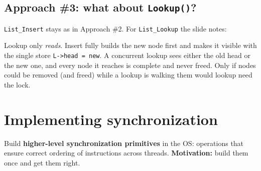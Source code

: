 \documentclass[11pt,a4paper]{article}
\begin{document}
\subsection{Approach \#3: what about \texttt{Lookup()}?}

\texttt{List\_Insert} stays as in Approach \#2. For \texttt{List\_Lookup}
the slide notes:

\begin{keybox}
Lookup only \emph{reads}. Insert fully builds the new node first and makes
it visible with the single store \texttt{L->head = new}. A concurrent lookup
sees either the old head or the new one, and every node it reaches is
complete and never freed. Only if nodes could be removed (and freed) while
a lookup is walking them would lookup need the lock.
\end{keybox}

\section{Implementing synchronization}

Build \textbf{higher-level synchronization primitives} in the OS:
operations that ensure correct ordering of instructions across threads.
\textbf{Motivation:} build them once and get them right.

\begin{center}
\end{center}
\end{document}
